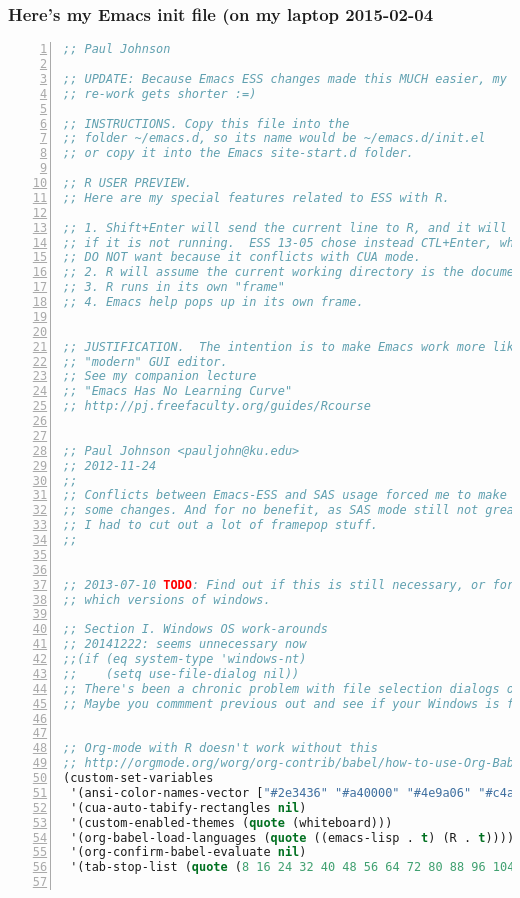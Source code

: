 \documentclass[11pt,english]{beamer}
\begin{document}
\begin{frame}
  \frametitle{Here's my Emacs init file (on my laptop 2015-02-04}

  \begin{lstlisting}[basicstyle={\tiny},language=Lisp,numbers=left,numberstyle={\tiny},tabsize=2]
 ;; Paul Johnson

;; UPDATE: Because Emacs ESS changes made this MUCH easier, my
;; re-work gets shorter :=)

;; INSTRUCTIONS. Copy this file into the 
;; folder ~/emacs.d, so its name would be ~/emacs.d/init.el
;; or copy it into the Emacs site-start.d folder.

;; R USER PREVIEW.
;; Here are my special features related to ESS with R.

;; 1. Shift+Enter will send the current line to R, and it will start R
;; if it is not running.  ESS 13-05 chose instead CTL+Enter, which I
;; DO NOT want because it conflicts with CUA mode. 
;; 2. R will assume the current working directory is the document directory.
;; 3. R runs in its own "frame" 
;; 4. Emacs help pops up in its own frame. 


;; JUSTIFICATION.  The intention is to make Emacs work more like a
;; "modern" GUI editor. 
;; See my companion lecture 
;; "Emacs Has No Learning Curve"
;; http://pj.freefaculty.org/guides/Rcourse


;; Paul Johnson <pauljohn@ku.edu>
;; 2012-11-24
;;
;; Conflicts between Emacs-ESS and SAS usage forced me to make
;; some changes. And for no benefit, as SAS mode still not great.
;; I had to cut out a lot of framepop stuff.
;;


;; 2013-07-10 TODO: Find out if this is still necessary, or for
;; which versions of windows.

;; Section I. Windows OS work-arounds
;; 20141222: seems unnecessary now
;;(if (eq system-type 'windows-nt)
;;    (setq use-file-dialog nil)) 
;; There's been a chronic problem with file selection dialogs on Windows
;; Maybe you commment previous out and see if your Windows is fixed.


;; Org-mode with R doesn't work without this
;; http://orgmode.org/worg/org-contrib/babel/how-to-use-Org-Babel-for-R.html
(custom-set-variables
 '(ansi-color-names-vector ["#2e3436" "#a40000" "#4e9a06" "#c4a000" "#204a87" "#5c3566" "#729fcf" "#eeeeec"])
 '(cua-auto-tabify-rectangles nil)
 '(custom-enabled-themes (quote (whiteboard)))
 '(org-babel-load-languages (quote ((emacs-lisp . t) (R . t))))
 '(org-confirm-babel-evaluate nil)
 '(tab-stop-list (quote (8 16 24 32 40 48 56 64 72 80 88 96 104 112 120 4))))


\end{lstlisting}
\end{frame}
\end{document}
